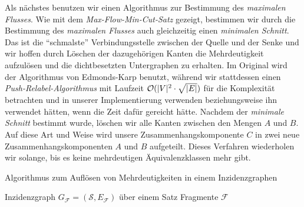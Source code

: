 Als nächstes benutzen wir einen Algorithmus zur Bestimmung des \emph{maximalen Flusses}. Wie mit dem \emph{Max-Flow-Min-Cut-Satz} gezeigt, bestimmen wir durch die Bestimmung des \emph{maximalen Flusses} auch gleichzeitig einen \emph{minimalen Schnitt}. Das ist die \enquote{schmalste} Verbindungsstelle zwischen der Quelle und der Senke und wir hoffen durch Löschen der dazugehörigen Kanten die Mehrdeutigkeit aufzulösen und die dichtbesetzten Untergraphen zu erhalten. Im Original wird der Algorithmus von Edmonds-Karp benutzt, während wir stattdessen einen \emph{Push-Relabel-Algorithmus} mit Laufzeit \emph{$\mathcal{O}(|V|^2\cdot \sqrt{|E|})$} für die Komplexität betrachten und in unserer Implementierung verwenden beziehungsweise ihn verwendet hätten, wenn die Zeit dafür gereicht hätte. Nachdem der \emph{minimale Schnitt} bestimmt wurde, löschen wir alle Kanten zwischen den Mengen $A$ und $B$. Auf diese Art und Weise wird unsere Zusammenhangskomponente $C$ in zwei neue Zusammenhangskomponenten $A$ und $B$ aufgeteilt. Dieses Verfahren wiederholen wir solange, bis es keine mehrdeutigen Äquivalenzklassen mehr gibt.  


\begin{algorithm}
	\caption{Algorithmus zum Auflösen von Mehrdeutigkeiten in einem Inzidenzgraphen}
	\label{alg:amb_res}
	\begin{algorithmic}[1]
		\Require Inzidenzgraph $G_{\mathcal{F}} = (\mathcal{S},E_{\mathcal{F}})$ über einem Satz Fragmente $\mathcal{F}$
				\EndWhile
			\EndWhile
		\EndProcedure
	\end{algorithmic}
\end{algorithm}

